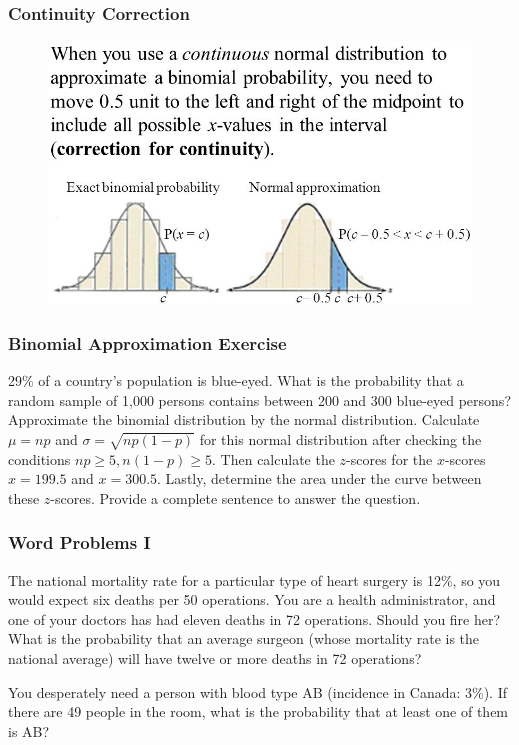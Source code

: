 \documentclass[xcolor=dvipsnames]{beamer}
\begin{document}
\begin{frame}
  \frametitle{Continuity Correction}
  \begin{figure}[h]
    \includegraphics[scale=.5]{./diagrams/contcorr_ed1.jpg}
  \end{figure}
\end{frame}

\begin{frame}
  \frametitle{Binomial Approximation Exercise}
{\ubung} 29\% of a country's population is blue-eyed. What is the
probability that a random sample of 1,000 persons contains between 200
and 300 blue-eyed persons? Approximate the binomial distribution by
the normal distribution. Calculate $\mu=np$ and
$\sigma=\sqrt{np(1-p)}$ for this normal distribution after checking
the conditions $np\geq{}5,n(1-p)\geq{}5$. Then calculate the
$z$-scores for the $x$-scores $x=199.5$ and $x=300.5$. Lastly,
determine the area under the curve between these $z$-scores. Provide a
complete sentence to answer the question.
\end{frame}

\begin{frame}
  \frametitle{Word Problems I}
  The national mortality rate for a particular type of heart surgery
  is 12\%, so you would expect six deaths per 50 operations. You are a
  health administrator, and one of your doctors has had eleven deaths
  in 72 operations. Should you fire her? What is the probability that
  an average surgeon (whose mortality rate is the national average)
  will have twelve or more deaths in 72 operations?

  \bigskip

  You desperately need a person with blood type AB (incidence in
  Canada: 3\%). If there are 49 people in the room, what is the
  probability that at least one of them is AB?
\end{frame}
\end{document}
